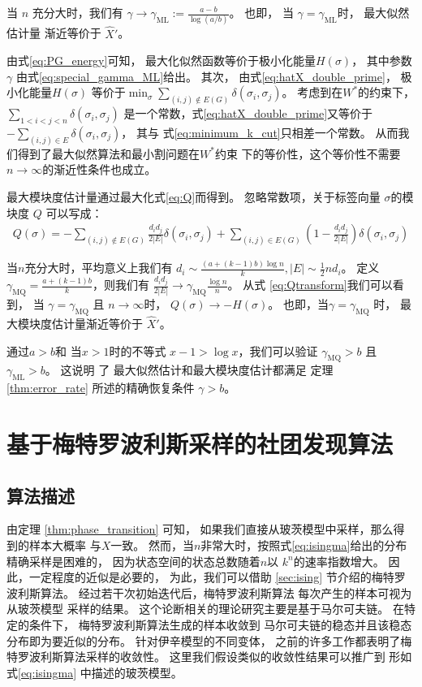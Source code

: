当 $n$ 充分大时，我们有 $\gamma \to \gamma_{\mathrm{ML}} := \frac{a-b}{\log(a/b)}$。   
也即，
当 $\gamma = \gamma_{\mathrm{ML}}$时，
最大似然估计量 渐近等价于 $\hat{X}'$。

由式\eqref{eq:PG_energy}可知，
最大化似然函数等价于极小化能量$H(\sigma)$，
其中参数$\gamma$
由式\eqref{eq:special_gamma_ML}给出。
其次，
由式\eqref{eq:hatX_double_prime}，
极小化能量$H(\sigma)$
等价于$\min_{\sigma} \sum_{(i,j) \not\in E(G) } \delta(\sigma_i, \sigma_j)$。
考虑到在$W^*$的约束下，
$\sum_{1<i<j<n} \delta(\sigma_i, \sigma_j)$
是一个常数，式\eqref{eq:hatX_double_prime}又等价于
$-\sum_{ (i,j) \in E} \delta(\sigma_i, \sigma_j)$，
其与 式\eqref{eq:minimum_k_cut}只相差一个常数。
从而我们得到了最大似然算法和最小割问题在$W^*$约束
下的等价性，这个等价性不需要$n\to\infty$的渐近性条件也成立。


最大模块度估计量通过最大化式\eqref{eq:Q}而得到。
忽略常数项，关于标签向量 $\sigma$的模块度 $Q$
可以写成：
\begin{align}
Q(\sigma) = -\sum_{(i,j) \not\in E(G) } \frac{d_i d_j}{2 |E|}\delta(\sigma_i,\sigma_j) 
+ \sum_{(i,j) \in E(G) } \left(1 - \frac{d_i d_j}{2 |E|} \right) \delta(\sigma_i,\sigma_j)  \label{eq:Qtransform}
\end{align}

当$n$充分大时，平均意义上我们有 $d_i \sim  \frac{(a+(k-1)b)\log n}{k}, |E| \sim \frac{1}{2}n d_i$。
定义$\gamma_{\mathrm{MQ}} = \frac{a+(k-1)b}{k}$，则我们有
$\frac{d_id_j}{2|E|} \to \gamma_{\mathrm{MQ}} \frac{\log n}{n} $。
从式 \eqref{eq:Qtransform}我们可以看到，
当 $\gamma = \gamma_{\mathrm{MQ}} $ 且 $n\to \infty$时，
$Q(\sigma) \to -H(\sigma)$。
也即，当$\gamma = \gamma_{\mathrm{MQ}}$ 时，
最大模块度估计量渐近等价于
$\hat{X}'$。


通过$a>b$和 当$x>1$时的不等式 
 $x-1>\log x $，我们可以验证
  $\gamma_{\mathrm{MQ}} >b$ 且  $\gamma_{\mathrm{ML}} > b$。
  这说明 了
  最大似然估计和最大模块度估计都满足
  定理 \ref{thm:error_rate} 所述的精确恢复条件 $\gamma > b $。

\section{基于梅特罗波利斯采样的社团发现算法}\label{sec:ms}
\subsection{算法描述}
由定理 \ref{thm:phase_transition} 可知，
如果我们直接从玻茨模型中采样，那么得到的样本大概率
与$X$一致。
然而，当$n$非常大时，按照式\eqref{eq:isingma}给出的分布精确采样是困难的，
因为状态空间的状态总数随着$n$以
$k^n$的速率指数增大。
因此，一定程度的近似是必要的，
为此，我们可以借助 \ref{sec:ising} 节介绍的梅特罗波利斯算法。 
经过若干次初始迭代后，梅特罗波利斯算法
每次产生的样本可视为从玻茨模型 采样的结果。
这个论断相关的理论研究主要是基于马尔可夫链。
在特定的条件下，
梅特罗波利斯算法生成的样本收敛到
马尔可夫链的稳态并且该稳态分布即为要近似的分布。
针对伊辛模型的不同变体，
之前的许多工作都表明了梅特罗波利斯算法采样的收敛性\cite{diaconis1998we}。
这里我们假设类似的收敛性结果可以推广到
形如 式\eqref{eq:isingma} 中描述的玻茨模型。

